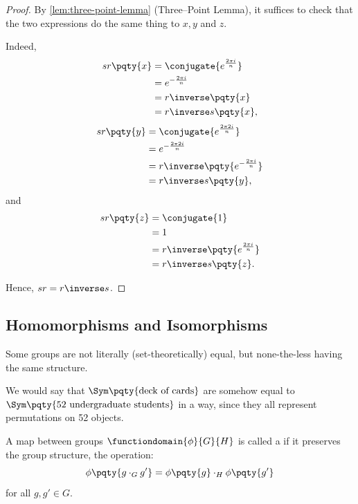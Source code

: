 \begin{proof}
    By \autoref{lem:three-point-lemma} (Three--Point Lemma), it suffices to check that the two expressions do the same thing to \(x, y\) and \(z\).

    Indeed,
    \begin{align*}
        sr\pqty{x} &= \conjugate{e^{\frac{2 \pi i}{n}}} \\
        &= e^{-\frac{2 \pi i}{n}} \\
        &= r\inverse \pqty{x} \\
        &= r\inverse s \pqty{x},
    \end{align*}
    \begin{align*}
        sr\pqty{y} &= \conjugate{e^{\frac{2 \pi 2 i}{n}}} \\
        &= e^{-\frac{2 \pi 2 i}{n}} \\
        &= r\inverse \pqty{e^{- \frac{2 \pi i}{n}}} \\
        &= r\inverse s \pqty{y},
    \end{align*}
    and
    \begin{align*}
        sr\pqty{z} &= \conjugate{1} \\
        &= 1 \\
        &= r\inverse \pqty{e^{\frac{2 \pi i}{n}}} \\
        &= r\inverse s \pqty{z}.
    \end{align*}

    Hence, \(sr = r\inverse s\).
\end{proof}

\subsection{Homomorphisms and Isomorphisms}
\label{sec:homomorphism-isomorphism}

Some groups are not literally (set-theoretically) equal, but none-the-less having the same structure.

\begin{example*}
    We would say that \(\Sym\pqty{\text{deck of cards}}\) are somehow equal to \(\Sym\pqty{\text{52 undergraduate students}}\) in a way, since they all represent permutations on 52 objects.
\end{example*}

\begin{definition}[Homomorphism]
    \label{def:homomorphism}%
    A map between groups \(\functiondomain{\phi}{G}{H}\) is called a  if it preserves the group structure, the operation:
    \[
        \phi\pqty{g \cdot_{G} g'} = \phi\pqty{g} \cdot_{H} \phi\pqty{g'}
    \]
    for all \(g, g' \in G\).
\end{definition}

